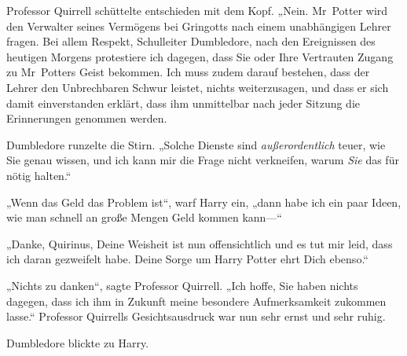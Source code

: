Professor Quirrell schüttelte entschieden mit dem Kopf. „Nein. Mr~Potter wird den Verwalter seines Vermögens bei Gringotts nach einem unabhängigen Lehrer fragen. Bei allem Respekt, Schulleiter Dumbledore, nach den Ereignissen des heutigen Morgens protestiere ich dagegen, dass Sie oder Ihre Vertrauten Zugang zu Mr~Potters Geist bekommen. Ich muss zudem darauf bestehen, dass der Lehrer den Unbrechbaren Schwur leistet, nichts weiterzusagen, und dass er sich damit einverstanden erklärt, dass ihm unmittelbar nach jeder Sitzung die Erinnerungen genommen werden.

Dumbledore runzelte die Stirn. „Solche Dienste sind \emph{außerordentlich} teuer, wie Sie genau wissen, und ich kann mir die Frage nicht verkneifen, warum \emph{Sie} das für nötig halten.“

„Wenn das Geld das Problem ist“, warf Harry ein, „dann habe ich ein paar Ideen, wie man schnell an große Mengen Geld kommen kann—“

„Danke, Quirinus, Deine Weisheit ist nun offensichtlich und es tut mir leid, dass ich daran gezweifelt habe. Deine Sorge um Harry Potter ehrt Dich ebenso.“

„Nichts zu danken“, sagte Professor Quirrell. „Ich hoffe, Sie haben nichts dagegen, dass ich ihm in Zukunft meine besondere Aufmerksamkeit zukommen lasse.“ Professor Quirrells Gesichtsausdruck war nun sehr ernst und sehr ruhig.

Dumbledore blickte zu Harry.

